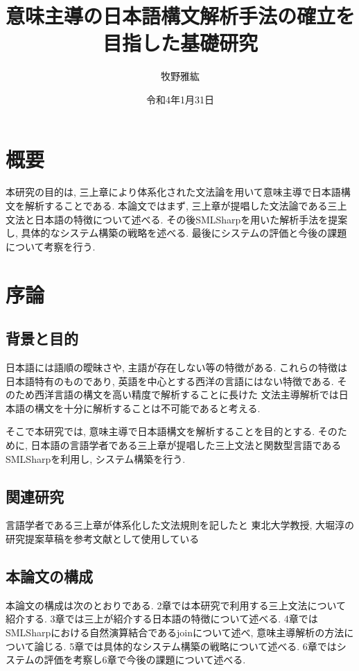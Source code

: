 \documentclass{jreport}
\title{意味主導の日本語構文解析手法の確立を目指した基礎研究}
\author{牧野雅紘}{B8TB2211}
\date{令和4年1月31日}{令和4年1月}
\begin{document}
\maketitle


\chapter*{概要}
本研究の目的は, 三上章により体系化された文法論を用いて意味主導で日本語構文を解析することである.
本論文ではまず, 三上章が提唱した文法論である三上文法と日本語の特徴について述べる. 
その後SMLSharpを用いた解析手法を提案し, 具体的なシステム構築の戦略を述べる.
最後にシステムの評価と今後の課題について考察を行う.

\setcounter{tocdepth}{1}
\tableofcontents

\chapter{序論}
\section{背景と目的}
日本語には語順の曖昧さや, 主語が存在しない等の特徴がある. これらの特徴は日本語特有のものであり, 
英語を中心とする西洋の言語にはない特徴である.  そのため西洋言語の構文を高い精度で解析することに長けた
文法主導解析では日本語の構文を十分に解析することは不可能であると考える. 

そこで本研究では, 意味主導で日本語構文を解析することを目的とする.
そのために, 日本語の言語学者である三上章が提唱した三上文法と関数型言語であるSMLSharpを利用し, システム構築を行う.

\section{関連研究}
言語学者である三上章が体系化した文法規則を記した\cite{bunken1}と
東北大学教授, 大堀淳の研究提案草稿\cite{bunken2}を参考文献として使用している


\section{本論文の構成}
本論文の構成は次のとおりである.
2章では本研究で利用する三上文法について紹介する.
3章では三上が紹介する日本語の特徴について述べる.
4章ではSMLSharpにおける自然演算結合であるjoinについて述べ, 意味主導解析の方法について論じる.
5章では具体的なシステム構築の戦略について述べる.
6章ではシステムの評価を考察し6章で今後の課題について述べる.
\end{document}
